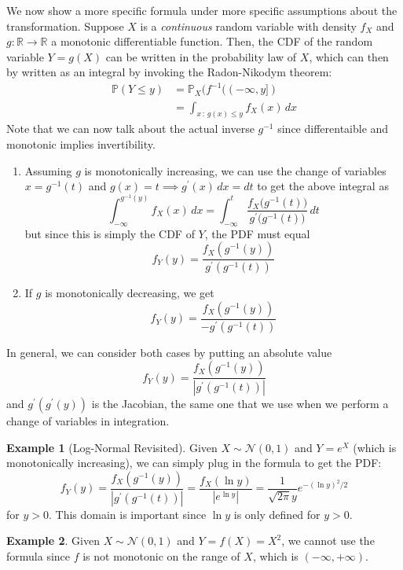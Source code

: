 \documentclass{article}
\theoremstyle{definition}
\newtheorem{example}{Example}[section]
\theoremstyle{remark}
\theoremstyle{definition}
\begin{document}
We now show a more specific formula under more specific assumptions about the transformation. Suppose $X$ is a \textit{continuous} random variable with density $f_X$ and $g: \mathbb{R} \rightarrow \mathbb{R}$ a monotonic differentiable function. Then, the CDF of the random variable $Y = g(X)$ can be written in the probability law of $X$, which can then by written as an integral by invoking the Radon-Nikodym theorem: 
\begin{align*}
    \mathbb{P}(Y \leq y) & = \mathbb{P}_X (f^{-1} ((-\infty, y]) \\
    & = \int_{x \,:\, g(x) \leq y} f_X (x) \,dx
\end{align*}
Note that we can now talk about the actual inverse $g^{-1}$ since differentaible and monotonic implies invertibility. 
\begin{enumerate}
    \item Assuming $g$ is monotonically increasing, we can use the change of variables $x = g^{-1} (t)$ and $g(x) = t \implies g^\prime (x) \,dx = dt$ to get the above integral as 
    \[\int_{-\infty}^{g^{-1} (y)} f_X (x) \,dx = \int_{-\infty}^t \frac{f_X \big( g^{-1} (t) \big)}{g^\prime \big( g^{-1} (t)\big)} \,dt \]
    but since this is simply the CDF of $Y$, the PDF must equal 
    \[f_Y (y) = \frac{f_X (g^{-1} (y) )}{g^\prime (g^{-1} (t))}\]
    \item If $g$ is monotonically decreasing, we get 
    \[f_Y (y) = \frac{f_X (g^{-1} (y) )}{- g^\prime (g^{-1} (t))}\]
\end{enumerate}
In general, we can consider both cases by putting an absolute value 
\[f_Y (y) = \frac{f_X (g^{-1} (y) )}{|g^\prime (g^{-1} (t))|}\]
and $g^\prime (g^\prime (y))$ is the Jacobian, the same one that we use when we perform a change of variables in integration. 

\begin{example}[Log-Normal Revisited]
Given $X \sim \mathcal{N}(0, 1)$ and $Y = e^X$ (which is monotonically increasing), we can simply plug in the formula to get the PDF: 
\[f_Y (y) = \frac{f_X (g^{-1} (y) )}{|g^\prime (g^{-1} (t))|} = \frac{f_X (\ln{y}) }{ | e^{\ln{y}} |} = \frac{1}{\sqrt{2 \pi} y} e^{-(\ln{y})^2 / 2}\]
for $y > 0$. This domain is important since $\ln{y}$ is only defined for $y > 0$. 
\end{example}

\begin{example}
Given $X \sim \mathcal{N}(0, 1)$ and $Y = f(X) = X^2$, we cannot use the formula since $f$ is not monotonic on the range of $X$, which is $(-\infty, +\infty)$.  
\end{example}
\end{document}
